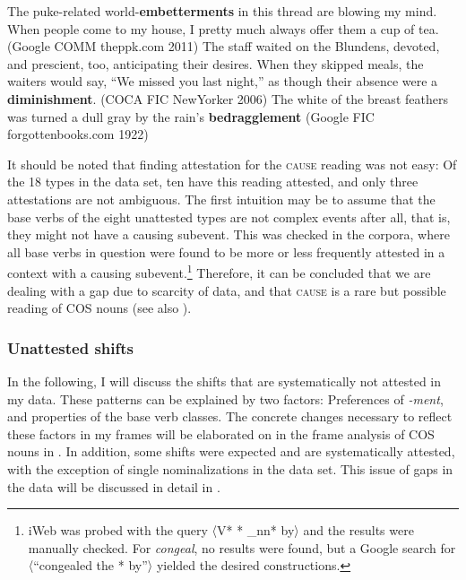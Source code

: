 \begin{exe}
  \ex \label{ex:cos-causev} 
  \begin{xlist}
    \ex \label{ex:cos-causev1} The puke-related world-\textbf{embetterments} in this thread are blowing my mind. When people come to my house, I pretty much always offer them a cup of tea. 
    {\small(Google COMM theppk.com 2011)}
    \ex \label{ex:cos-causev2} The staff waited on the Blundens, devoted, and prescient, too, anticipating their desires. When they skipped meals, the waiters would say, ``We missed you last night,'' as though their absence were a \textbf{diminishment}. {\small(\acs{COCA} FIC NewYorker 2006)}
    \ex \label{ex:cos-causev3} The white of the breast feathers was turned a dull gray by the rain's \textbf{bedragglement} {\small(Google FIC forgottenbooks.com 1922)}
  \end{xlist}
\end{exe}  

\noindent It should be noted that finding attestation for the \textsc{cause} reading was not easy: Of the 18 types in the data set, ten have this reading attested, and only three attestations are not ambiguous. The first intuition may be to assume that the base verbs of the eight unattested types are not complex events after all, that is, they might not have a causing subevent. This was checked in the corpora, where all base verbs in question were found to be more or less frequently attested in a context with a causing subevent.\footnote{\acs{iWeb} was probed with the query 〈V* * \_nn* by〉 and the results were manually checked. For \textit{congeal}, no results were found, but a Google search for 〈``congealed the * by''〉 yielded the desired constructions.} Therefore, it can be concluded that we are dealing with a gap due to scarcity of data, and that \textsc{cause} is a rare but possible reading of COS nouns (see also ).

\subsubsection{Unattested shifts}
\label{sec:cos-output-survey-unatt}

In the following, I will discuss the shifts that are systematically not attested in my data. These patterns can be explained by two factors: Preferences of \textit{-ment}, and properties of the base verb classes. 
The concrete changes necessary to  reflect these factors in my frames will be elaborated on in the frame analysis of COS nouns in . 
In addition, some shifts were expected and are systematically attested, with the exception of single nominalizations in the data set. This issue of gaps in the data will be discussed in detail in .

